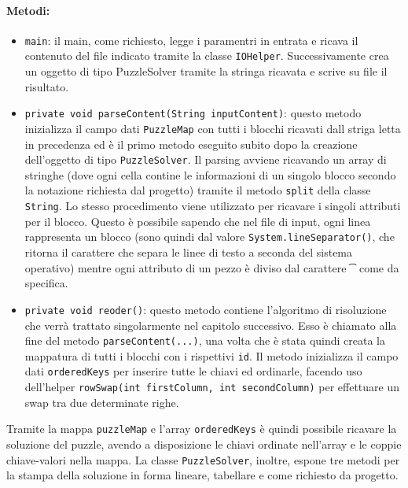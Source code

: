\paragraph{Metodi:}
\begin{itemize}
\item \texttt{main}: il main, come richiesto, legge i paramentri in entrata e ricava il contenuto del file indicato tramite la classe \texttt{IOHelper}. Successivamente crea un oggetto di tipo PuzzleSolver tramite la stringa ricavata e scrive su file il risultato.
\item \texttt{private void parseContent(String inputContent)}: questo metodo inizializza il campo dati \texttt{PuzzleMap} con tutti i blocchi ricavati dall striga letta in precedenza ed è il primo metodo eseguito subito dopo la creazione dell'oggetto di tipo \texttt{PuzzleSolver}. Il parsing avviene ricavando un array di stringhe (dove ogni cella contine le informazioni di un singolo blocco secondo la notazione richiesta dal progetto) tramite il metodo \texttt{split} della classe \texttt{String}. Lo stesso procedimento viene utilizzato per ricavare i singoli attributi per il blocco. Questo è possibile sapendo che nel file di input, ogni linea rappresenta un blocco (sono quindi dal valore \texttt{System.lineSeparator()}, che ritorna il carattere che separa le linee di testo a seconda del sistema operativo) mentre ogni attributo di un pezzo è diviso dal carattere \texttt{\t} come da specifica.

\item \texttt{private void reoder()}: questo metodo contiene l'algoritmo di risoluzione che verrà trattato singolarmente nel capitolo successivo. Esso è chiamato alla fine del metodo \texttt{parseContent(...)}, una volta che è stata quindi creata la mappatura di tutti i blocchi con i rispettivi \texttt{id}. Il metodo inizializza il campo dati \texttt{orderedKeys} per inserire tutte le chiavi ed ordinarle, facendo uso dell'helper \texttt{rowSwap(int firstColumn, int secondColumn)} per effettuare un swap tra due determinate righe.
\end{itemize}

Tramite la mappa \texttt{puzzleMap} e l'array \texttt{orderedKeys} è quindi possibile ricavare la soluzione del puzzle, avendo a disposizione le chiavi ordinate nell'array e le coppie chiave-valori nella mappa. La classe \texttt{PuzzleSolver}, inoltre, espone tre metodi per la stampa della soluzione in forma lineare, tabellare e come richiesto da progetto.
